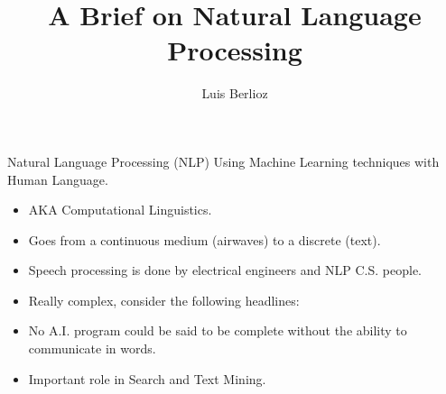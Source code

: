 \documentclass[handout]{beamer}
\title{A Brief on Natural Language Processing}
\author{Luis Berlioz}
\begin{document}
\maketitle

\begin{frame}{Natural Language Processing (NLP)}
    Using Machine Learning techniques with Human Language.
    \begin{itemize}
            \item AKA Computational Linguistics.
            \item Goes from a continuous medium (airwaves) to a discrete (text).
        \item Speech processing is done by electrical engineers and NLP C.S. people.
            \item Really complex, consider the following headlines:
    \item No A.I. program could be said to be complete without the ability to communicate in words.
        \item Important role in Search and Text Mining.
    \end{itemize}
     
\end{frame}
\end{document}
